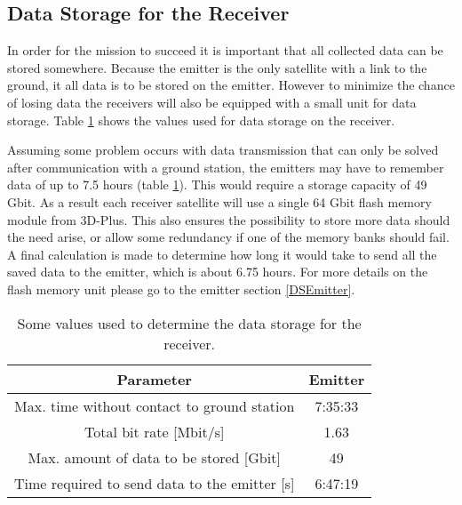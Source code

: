 \subsection{Data Storage for the Receiver}
\label{DSReceiver}

In order for the mission to succeed it is important that all collected data can be stored somewhere. Because the emitter is the only satellite with a link to the ground, it all data is to be stored on the emitter. However to minimize the chance of losing data the receivers will also be equipped with a small unit for data storage. Table \ref{DSReceiverTable} shows the values used for data storage on the receiver. 

Assuming some problem occurs with data transmission that can only be solved after communication with a ground station, the emitters may have to remember data of up to 7.5 hours (table \ref{DSReceiverTable}). This would require a storage capacity of 49 Gbit. As a result each receiver satellite will use a single 64 Gbit flash memory module from 3D-Plus. This also ensures the possibility to store more data should the need arise, or allow some redundancy if one of the memory banks should fail. A final calculation is made to determine how long it would take to send all the saved data to the emitter, which is about 6.75 hours. For more details on the flash memory unit please go to the emitter section \ref{DSEmitter}.

\begin{table}
\centering
\begin{tabular}{c|c}
\textbf{Parameter}  & \textbf{Emitter} \\\hline\hline
	Max. time without contact to ground station & 7:35:33 \\
	Total bit rate [Mbit/s] & 1.63 \\
	Max. amount of data to be stored [Gbit] & 49 \\
	Time required to send data to the emitter [s] & 6:47:19 \\
\end{tabular}
\caption{Some values used to determine the data storage for the receiver.}
\label{DSReceiverTable}
\end{table}